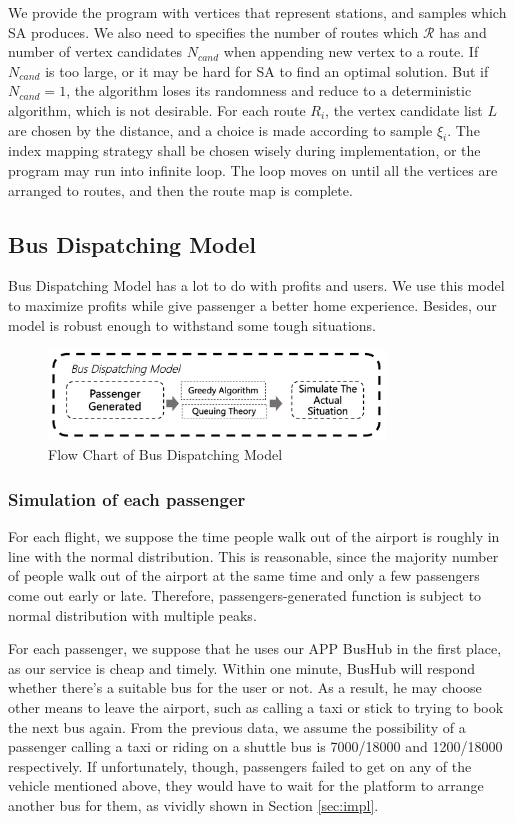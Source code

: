 \documentclass{mcmthesis}
\begin{document}
We provide the program with vertices that represent stations, and samples which SA produces. We also need to specifies the number of routes which $\mathscr{R}$ has and number of vertex candidates $N_{cand}$ when appending  new vertex to a route. If $N_{cand}$ is too large, or it may be hard for SA to find an optimal solution. But if $N_{cand} = 1$, the algorithm loses its randomness and reduce to a deterministic algorithm, which is not desirable. For each route $R_i$, the vertex candidate list $L$ are  chosen by the distance, and a choice is made according to sample $\xi_i$. The index mapping strategy shall be chosen wisely during implementation, or the program may run into infinite loop.  The loop moves on until all the vertices are arranged to routes, and then the route map is complete.


\subsection{Bus Dispatching Model}

Bus Dispatching Model has a lot to do with profits and users. We use this model to maximize profits while give passenger a better home experience. Besides, our model is robust enough to withstand some tough situations.

\begin{figure}
    \centering
    \includegraphics[width=0.8\textwidth]{figures/flowchart2.png}
    \caption{Flow Chart of Bus Dispatching Model}
    \label{fig:flowchart2}
\end{figure}
\subsubsection{Simulation of each passenger}\label{subsub:simu}

For each flight, we suppose the time people walk out of the airport is roughly in line with the normal distribution. This is reasonable, since the majority number of people walk out of the airport at the same time and only a few passengers come out early or late. Therefore, passengers-generated function is subject to normal distribution with multiple peaks.

For each passenger, we suppose that he uses our APP BusHub in the first place, as our service is cheap and timely. Within one minute, BusHub will respond whether there's a suitable bus for the user or not. As a result, he may choose other means to leave the airport, such as calling a taxi or stick to trying to book the next bus again. From the previous data, we assume the possibility of a passenger calling a taxi or riding on a shuttle bus is 7000/18000 and 1200/18000 respectively. If unfortunately, though, passengers failed to get on any of the vehicle mentioned above, they would have to wait for the platform to arrange another bus for them, as vividly shown in Section \ref{sec:impl}.
\end{document}
